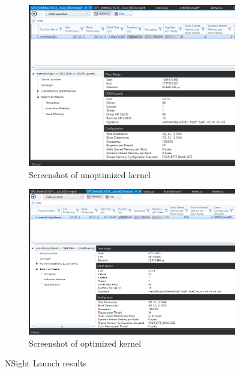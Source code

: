 \documentclass{article}
\begin{document}
\begin{figure}
    \centering
    \begin{subfigure}[b]{\textwidth}
        \centering
        \includegraphics[width=\textwidth]{slow.png}
        \caption{Screenshot of unoptimized kernel}
    \end{subfigure}

    \begin{subfigure}[b]{\textwidth}
        \centering
        \includegraphics[width=\textwidth]{fast.png}
        \caption{Screenshot of optimized kernel}
    \end{subfigure}
    \caption{NSight Launch results}
\end{figure}
\end{document}
